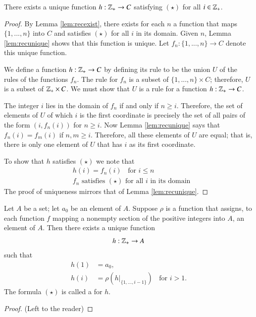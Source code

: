 \documentclass[12pt, a4paper, oneside, openright, titlepage]{book}
\begin{document}
\begin{appendices}
    \begin{thm}
        There exists a unique function $h:\mathbb Z_+\rightarrow C$ satisfying $(\star)$ for all $i \in \mathbb Z_+$.
    \end{thm}
    \begin{proof}
        By Lemma \ref{lem:recexist}, there exists for each $n$ a function that maps $\{1,...,n\}$ into $C$ and satisfies $(\star)$ for all $i$ in its domain. Given $n$, Lemma \ref{lem:recunique} shows that this function is unique. Let $f_n:\{1,...,n\}\rightarrow C$ denote this unique function.


        We define a function $h:\mathbb Z_+\rightarrow C$ by defining its rule to be the union $U$ of the rules of the functions $f_n$. The rule for $f_n$ is a subset of $\{1,...,n\}\times C$; therefore, $U$ is a subset of $\mathbb Z_+\times C$. We must show that $U$ is a rule for a function $h:\mathbb Z_+\rightarrow C$.

        The integer $i$ lies in the domain of $f_n$ if and only if $n \geq i$. Therefore, the set of elements of $U$ of which $i$ is the first coordinate is precisely the set of all pairs of the form $(i,f_n(i))$ for $n \geq i$. Now Lemma \ref{lem:recunique} says that $f_n(i) = f_m(i)$ if $n,m \geq i$. Therefore, all these elements of $U$ are equal; that is, there is only one element of $U$ that has $i$ as its first coordinate.

        To show that $h$ satisfies $(\star)$ we note that \begin{align*}
            &h(i) = f_n(i)\;\;\text{ for } i \leq n \\
            &f_n\text{ satisfies $(\star)$ for all $i$ in its domain}
        \end{align*}
        The proof of uniqueness mirrors that of Lemma \ref{lem:recunique}.
    \end{proof}

    \begin{namthm}
        Let $A$ be a set; let $a_0$ be an element of $A$. Suppose $\rho$ is a function that assigns, to each function $f$ mapping a nonempty section of the positive integers into $A$, an element of $A$. Then there exists a unique function \begin{equation*}
            h:\mathbb Z_+\rightarrow A
        \end{equation*}
        such that \begin{equation*}
            \begin{array}{cl} h(1) &= a_0, \\
                h(i) &= \rho(h\rvert_{\{1,...,i-1\}})\;\;\text{ for } i > 1.
            \end{array} \tag{$(\star)$}
        \end{equation*}
        The formula $(\star)$ is called a  for $h$. 
    \end{namthm}
    \begin{proof}
        (Left to the reader)
    \end{proof}



\end{appendices}
\end{document}
